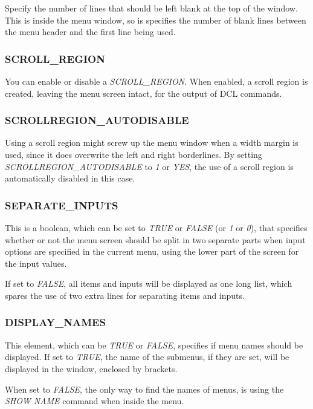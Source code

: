 \documentclass[a4paper]{book}
\begin{document}
Specify the number of lines that should be left blank at the top of the 
window. This is inside the menu window, so is specifies the number of blank 
lines between the menu header and the first line being used.

\subsubsection{SCROLL{\_}REGION}

You can enable or disable a \textsl{SCROLL{\_}REGION}. When enabled, a scroll region 
is created, leaving the menu screen intact, for the output of DCL commands.

\subsubsection{SCROLLREGION{\_}AUTODISABLE}

Using a scroll region might screw up the menu window when a width margin is 
used, since it does overwrite the left and right borderlines. By setting 
\textsl{SCROLLREGION{\_}AUTODISABLE} to \textsl{1} or \textsl{YES}, the use of a scroll region is 
automatically disabled in this case.

\subsubsection{SEPARATE{\_}INPUTS}

This is a boolean, which can be set to \textsl{TRUE} or \textsl{FALSE} (or \textsl{1} or \textsl{0}), that 
specifies whether or not the menu screen should be split in two separate 
parts when input options are specified in the current menu, using the lower 
part of the screen for the input values.

If set to \textsl{FALSE}, all items and inputs will be displayed as one long list, 
which spares the use of two extra lines for separating items and inputs.

\subsubsection{DISPLAY{\_}NAMES}

This element, which can be \textsl{TRUE} or \textsl{FALSE}, specifies if menu names should be 
displayed. If set to \textsl{TRUE}, the name of the submenus, if they are set, will 
be displayed in the window, enclosed by brackets.

When set to \textsl{FALSE}, the only way to find the names of menus, is using the 
\textsl{SHOW NAME} command 
when inside the menu.
\end{document}
